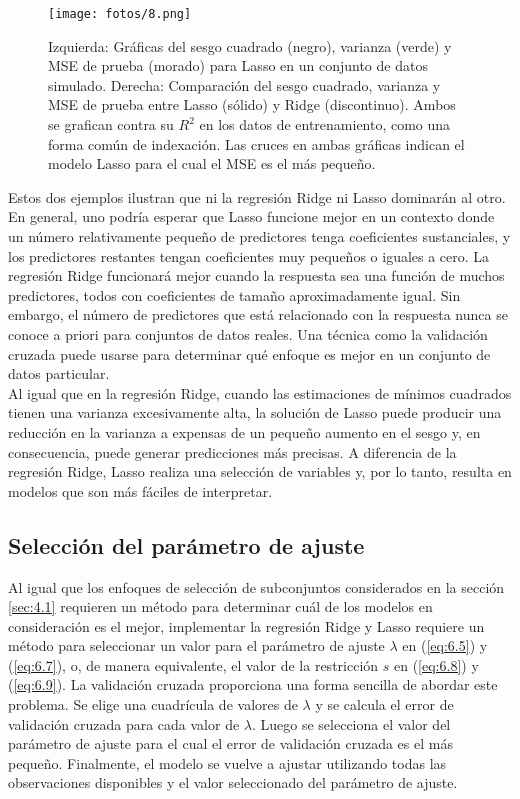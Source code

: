 \begin{figure}[h]
\centering
\texttt{[image: fotos/8.png]}
\caption{Izquierda: Gráficas del sesgo cuadrado (negro), varianza (verde) y MSE de prueba (morado) para Lasso en un conjunto de datos simulado. Derecha: Comparación del sesgo cuadrado, varianza y MSE de prueba entre Lasso (sólido) y Ridge (discontinuo). Ambos se grafican contra su $R^2$ en los datos de entrenamiento, como una forma común de indexación. Las cruces en ambas gráficas indican el modelo Lasso para el cual el MSE es el más pequeño.}
\label{fig:6.9}
\end{figure}

Estos dos ejemplos ilustran que ni la regresión Ridge ni Lasso dominarán al otro. En general, uno podría esperar que Lasso funcione mejor en un contexto donde un número relativamente pequeño de predictores tenga coeficientes sustanciales, y los predictores restantes tengan coeficientes muy pequeños o iguales a cero. La regresión Ridge funcionará mejor cuando la respuesta sea una función de muchos predictores, todos con coeficientes de tamaño aproximadamente igual. Sin embargo, el número de predictores que está relacionado con la respuesta nunca se conoce a priori para conjuntos de datos reales. Una técnica como la validación cruzada puede usarse para determinar qué enfoque es mejor en un conjunto de datos particular. \\ 

Al igual que en la regresión Ridge, cuando las estimaciones de mínimos cuadrados tienen una varianza excesivamente alta, la solución de Lasso puede producir una reducción en la varianza a expensas de un pequeño aumento en el sesgo y, en consecuencia, puede generar predicciones más precisas. A diferencia de la regresión Ridge, Lasso realiza una selección de variables y, por lo tanto, resulta en modelos que son más fáciles de interpretar.

\subsection{Selección del parámetro de ajuste}

Al igual que los enfoques de selección de subconjuntos considerados en la sección \ref{sec:4.1} requieren un método para determinar cuál de los modelos en consideración es el mejor, implementar la regresión Ridge y Lasso requiere un método para seleccionar un valor para el parámetro de ajuste $\lambda$ en (\ref{eq:6.5}) y (\ref{eq:6.7}), o, de manera equivalente, el valor de la restricción $s$ en (\ref{eq:6.8}) y (\ref{eq:6.9}). La validación cruzada proporciona una forma sencilla de abordar este problema. Se elige una cuadrícula de valores de $\lambda$ y se calcula el error de validación cruzada para cada valor de $\lambda$. Luego se selecciona el valor del parámetro de ajuste para el cual el error de validación cruzada es el más pequeño. Finalmente, el modelo se vuelve a ajustar utilizando todas las observaciones disponibles y el valor seleccionado del parámetro de ajuste. 

